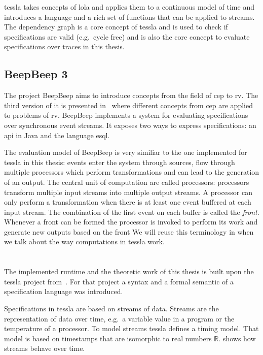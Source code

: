 \gls{tessla} takes concepts of \gls{lola} and applies them to a continuous model of time and introduces a language and a rich set of functions that can be applied to streams.
The dependency graph is a core concept of \gls{tessla} and is used to check if specifications are valid (e.g.\ cycle free) and is also the core concept to evaluate specifications over traces in this thesis.

\subsection{BeepBeep 3}
\label{sec:related:stream_based:beepbeep}

The project BeepBeep aims to introduce concepts from the field of \gls{cep} to \gls{rv}.
The third version of it is presented in~\cite{Hall2011} where different concepts from \gls{cep} are applied to problems of \gls{rv}.
BeepBeep implements a system for evaluating specifications over synchronous event streams.
It exposes two ways to express specifications: an \gls{api} in Java and the language \gls{esql}.

The evaluation model of BeepBeep is very similiar to the one implemented for \gls{tessla} in this thesis: events enter the system through sources, flow through multiple processors which perform transformations and can lead to the generation of an output.
The central unit of computation are called processors: processors transform multiple input streams into multiple output streams.
A processor can only perform a transformation when there is at least one event buffered at each input stream.
The combination of the first event on each buffer is called the \emph{front}.
Whenever a front can be formed the processor is invoked to perform its work and generate new outputs based on the front
We will reuse this terminology in  when we talk about the way computations in \gls{tessla} work.

\section{}
\label{sec:related:tessla}

The implemented runtime and the theoretic work of this thesis is built upon the \gls{tessla} project from~\cite{Decker2016}.
For that project a syntax and a formal semantic of a specification language was introduced.

Specifications in \gls{tessla} are based on streams of data.
Streams are the representation of data over time, e.g.\ a variable value in a program or the temperature of a processor.
To model streams \gls{tessla} defines a timing model.
That model is based on timestamps that are isomorphic to real numbers \(\mathbb{R}\).
 shows how streams behave over time.

